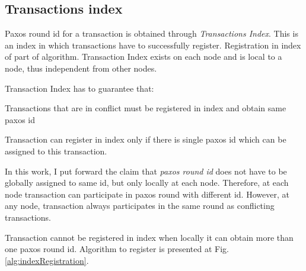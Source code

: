 
\subsection{Transactions index}
Paxos round id for a transaction is obtained through \emph{Transactions Index}. This is an index in which transactions have to successfully register. Registration in index of part of \mpp algorithm. Transaction Index exists on each node and is local to a node, thus independent from other nodes.

Transaction Index has to guarantee that: 
\begin{enumerate*}
\item Transactions that are in conflict must be registered in index and obtain same paxos id
\item Transaction can register in index only if there is single paxos id which can be assigned to this transaction.
\end{enumerate*}

In this work, I put forward the claim that \emph{paxos round id} does not have to be globally assigned to same id, but only locally at each node. Therefore, at each node transaction can participate in paxos round with different id. However, at any node, transaction always participates in the same round as conflicting transactions.

Transaction cannot be registered in index when locally it can obtain more than one paxos round id. Algorithm to register is presented at Fig. \ref{alg:indexRegistration}.


